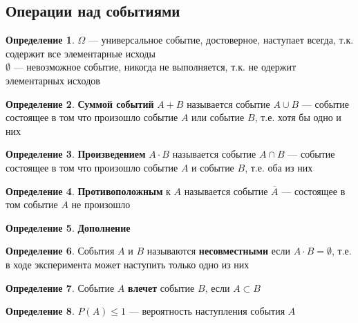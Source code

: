 \documentclass[oneside]{book}
\theoremstyle{plain}
\theoremstyle{remark}
\theoremstyle{definition}
\newtheorem*{definition}{Определение}
\begin{document}
\subsection{Операции над событиями}
\label{sec:org3439664}
\begin{definition}
\(\Omega\) --- универсальное событие, достоверное, наступает всегда, т.к. содержит все элементарные исходы \\
\(\emptyset\) --- невозможное событие, никогда не выполняется, т.к. не одержит элементарных исходов
\end{definition}
\begin{definition}
\textbf{Суммой событий} \(A + B\) называется событие \(A \cup B\) --- событие
 состоящее в том что произошло событие \(A\) или событие \(B\), т.е. хотя
 бы одно и них
\end{definition}
\begin{definition}
\textbf{Произведением} \(A \cdot B\) называется событие \(A \cap B\) --- событие состоящее в том что произошло событие \(A\) и событие \(B\), т.е. оба из них
\end{definition}
\begin{definition}
\textbf{Противоположным} к \(A\) называется событие \(\overline{A}\) --- состоящее в том событие \(A\) не произошло
\end{definition}
\begin{center}
\end{center}
\begin{definition}
\textbf{Дополнение}
\end{definition}
\begin{definition}
События \(A\) и \(B\) называются \textbf{несовместными} если \(A\cdot B = \emptyset\), т.е. в ходе эксперимента может наступить только одно из них
\end{definition}
\begin{definition}
Событие \(A\) \textbf{влечет} событие \(B\), если \(A \subset B\)
\end{definition}
\begin{definition}
\(P(A) \le 1\) --- вероятность наступления события \(A\)
\end{definition}
\end{document}
